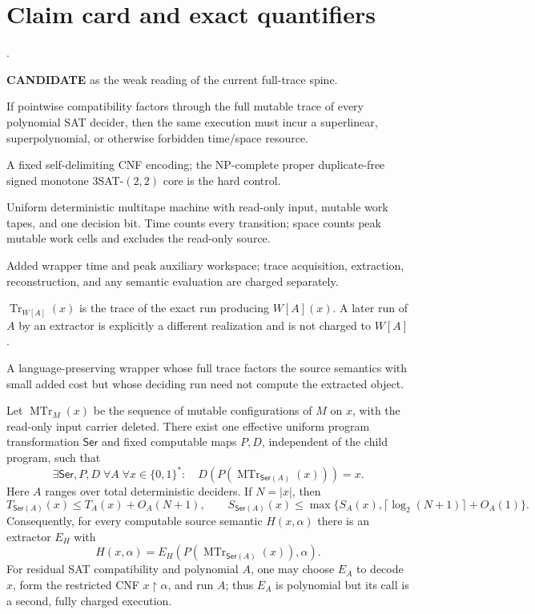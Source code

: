 \documentclass[11pt]{article}
\newcommand{\CAND}{\textbf{CANDIDATE}}
\newcommand{\claim}[1]{\texttt{\detokenize{#1}}}
\begin{document}
\section{Claim card and exact quantifiers}

\begin{description}[leftmargin=3.2cm,style=nextline]
\item[Claim ID.] \claim{BARE-FULL-TRACE-FACTORIZATION-AS-RESOURCE1}.
\item[Status before run.] \CAND{} as the weak reading of the current full-trace spine.
\item[Desired conclusion attacked.] If pointwise compatibility factors through the full mutable trace of every polynomial SAT decider, then the same execution must incur a superlinear, superpolynomial, or otherwise forbidden time/space resource.
\item[Input family.] A fixed self-delimiting CNF encoding; the NP-complete proper duplicate-free signed monotone $3$SAT-$(2,2)$ core is the hard control.
\item[Machine/model.] Uniform deterministic multitape machine with read-only input, mutable work tapes, and one decision bit.  Time counts every transition; space counts peak mutable work cells and excludes the read-only source.
\item[Resource.] Added wrapper time and peak auxiliary workspace; trace acquisition, extraction, reconstruction, and any semantic evaluation are charged separately.
\item[SAME\_REALIZATION.] $\operatorname{Tr}_{W[A]}(x)$ is the trace of the exact run producing $W[A](x)$.  A later run of $A$ by an extractor is explicitly a different realization and is not charged to $W[A]$.
\item[What falsifies the claim.] A language-preserving wrapper whose full trace factors the source semantics with small added cost but whose deciding run need not compute the extracted object.
\end{description}

Let $\operatorname{MTr}_M(x)$ be the sequence of mutable configurations of
$M$ on $x$, with the read-only input carrier deleted.  There exist one
effective uniform program transformation $\mathsf{Ser}$ and fixed computable
maps $P,D$, independent of the child program, such that
\[
 \exists\mathsf{Ser},P,D\;\forall A\;\forall x\in\{0,1\}^*:
 \quad D(P(\operatorname{MTr}_{\mathsf{Ser}(A)}(x)))=x.
\]
Here $A$ ranges over total deterministic deciders.  If $N=|x|$, then
\[
 T_{\mathsf{Ser}(A)}(x)\le T_A(x)+O_A(N+1),\qquad
 S_{\mathsf{Ser}(A)}(x)\le
 \max\{S_A(x),\lceil\log_2(N+1)\rceil+O_A(1)\}.
\]
Consequently, for every computable source semantic $H(x,\alpha)$ there is an
extractor $E_H$ with
\[
 H(x,\alpha)=E_H(P(\operatorname{MTr}_{\mathsf{Ser}(A)}(x)),\alpha).
\]
For residual SAT compatibility and polynomial $A$, one may choose $E_A$ to
decode $x$, form the restricted CNF $x\upharpoonright\alpha$, and run $A$;
thus $E_A$ is polynomial but its call is a second, fully charged execution.
\end{document}
